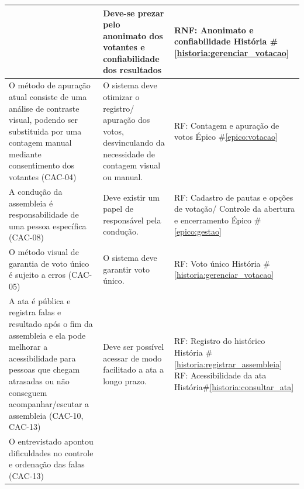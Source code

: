 \documentclass[12pt,a4paper]{article}
\newcounter{epico}
\newcounter{historia}
\begin{document}
\begin{longtable}{|p{7cm}|p{4.5cm}|p{4.5cm}|}
    &Deve-se prezar pelo anonimato dos votantes e confiabilidade dos resultados 
    
    &RNF: Anonimato e confiabilidade
    \newline \newline História \#\ref{historia:gerenciar_votacao}\\
    \hline
     O método de apuração atual consiste de uma análise de contraste visual, podendo ser substituida por uma contagem manual mediante consentimento dos votantes (CAC-04)
     
     &O sistema deve otimizar o registro/ apuração dos votos, desvinculando da necessidade de contagem visual ou manual. 
     
     & RF: Contagem e apuração de votos
     \newline \newline Épico \#\ref{epico:votacao}\\
    \hline
    A condução da assembleia é responsabilidade de uma pessoa específica (CAC-08) 
    
    &Deve existir um papel de responsável pela condução.
    
    &RF: Cadastro de pautas e opções de votação/ Controle da abertura e encerramento
    \newline \newline Épico \#\ref{epico:gestao}\\
    \hline
    O método visual de garantia de voto único é sujeito a erros (CAC-05)
    
    &O sistema deve garantir voto único.
    
    &RF: Voto único 
    \newline \newline História \#\ref{historia:gerenciar_votacao}\\
    \hline
    A ata é pública e registra falas e resultado após o fim da assembleia e ela pode melhorar a acessibilidade para pessoas que chegam atrasadas ou não conseguem acompanhar/escutar a assembleia (CAC-10, CAC-13)
    
    &Deve ser possível acessar de modo facilitado a ata a longo prazo. 
    
    &RF: Registro do histórico
    \newline \newline História \#\ref{historia:registrar_assembleia}
    \newline \newline RF: Acessibilidade da ata
    \newline \newline História\#\ref{historia:consultar_ata}\\
    \hline
    O entrevistado apontou dificuldades no controle e ordenação das falas (CAC-13)
    

\end{longtable}
\end{document}
